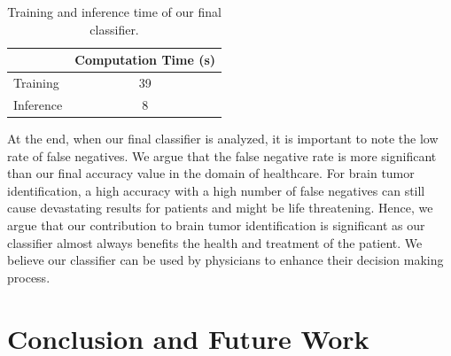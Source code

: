 \documentclass[conference]{IEEEtran}
\begin{document}
\begin{table}[h]
\centering
\caption{Training and inference time of our final classifier. }
\label{tab:my-table}

\begin{tabular}{|l|c|}
\hline
          & \multicolumn{1}{l|}{Computation Time (s)} \\ \hline
Training  & 39                                        \\ \hline
Inference & 8                                         \\ \hline
\end{tabular}
\end{table}

At the end, when our final classifier is analyzed, it is important to note the low rate of false negatives. We argue that the false negative rate is more significant than our final accuracy value in the domain of healthcare. For brain tumor identification, a high accuracy with a high number of false negatives can still cause devastating results for patients and might be life threatening. Hence, we argue that our contribution to brain tumor identification is significant as our classifier almost always benefits the health and treatment of the patient. We believe our classifier can be used by physicians to enhance their decision making process.  


\section{Conclusion and Future Work}\label{conclusion}
\end{document}
